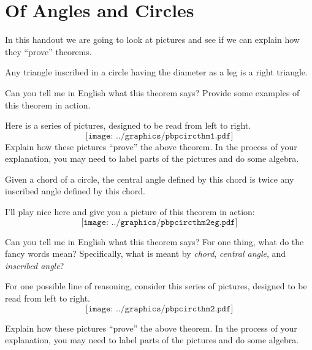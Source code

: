 \newpage
\section{Of Angles and Circles} %


In this handout we are going to look at pictures and see if we can
explain how they ``prove'' theorems.


\begin{theorem} 
Any triangle inscribed in a circle having the diameter as a leg is a
right triangle.
\end{theorem}

\begin{prob}
Can you tell me in English what this theorem says? Provide some
examples of this theorem in action.
\end{prob}

\begin{prob} 
Here is a series of pictures, designed to be read from left to right.
\[
\texttt{[image: ../graphics/pbpcircthm1.pdf]}
\]
Explain how these pictures ``prove'' the above theorem. In the process
of your explanation, you may need to label parts of the pictures and
do some algebra.
\end{prob}


\begin{theorem} 
Given a chord of a circle, the central angle defined by this chord is
twice any inscribed angle defined by this chord.
\end{theorem}

I'll play nice here and give you a picture of this theorem in action:
\[
\texttt{[image: ../graphics/pbpcircthm2eg.pdf]}
\]

\begin{prob}
Can you tell me in English what this theorem says? For one thing, what
do the fancy words mean? Specifically, what is meant by
\textit{chord}, \textit{central angle}, and \textit{inscribed angle}?
\end{prob}

\begin{prob} 
For one possible line of reasoning, consider this series of pictures, designed to be read from left to right.
\[
\texttt{[image: ../graphics/pbpcircthm2.pdf]}
\]

Explain how these pictures ``prove'' the above theorem. In the process
of your explanation, you may need to label parts of the pictures and
do some algebra.
\end{prob}

